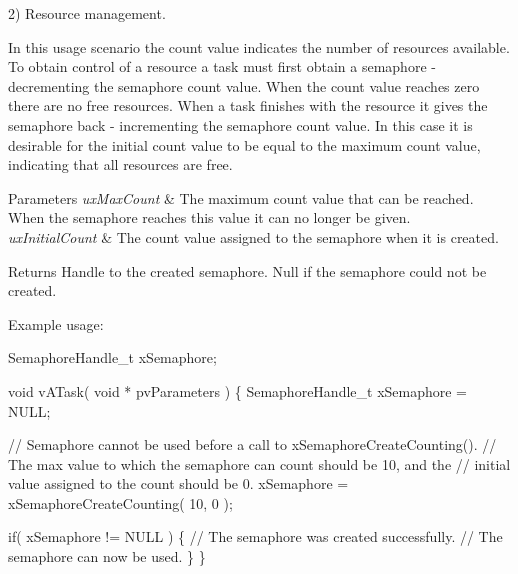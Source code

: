 2) Resource management.

In this usage scenario the count value indicates the number of resources available. To obtain control of a resource a task must first obtain a semaphore -\/ decrementing the semaphore count value. When the count value reaches zero there are no free resources. When a task finishes with the resource it \textquotesingle{}gives\textquotesingle{} the semaphore back -\/ incrementing the semaphore count value. In this case it is desirable for the initial count value to be equal to the maximum count value, indicating that all resources are free.


\begin{DoxyParams}{Parameters}
{\em ux\+Max\+Count} & The maximum count value that can be reached. When the semaphore reaches this value it can no longer be \textquotesingle{}given\textquotesingle{}.\\
\hline
{\em ux\+Initial\+Count} & The count value assigned to the semaphore when it is created.\\
\hline
\end{DoxyParams}
\begin{DoxyReturn}{Returns}
Handle to the created semaphore. Null if the semaphore could not be created.
\end{DoxyReturn}
Example usage\+: 
\begin{DoxyPre}
SemaphoreHandle\_t xSemaphore;\end{DoxyPre}



\begin{DoxyPre}void vATask( void * pvParameters )
\{
SemaphoreHandle\_t xSemaphore = NULL;\end{DoxyPre}



\begin{DoxyPre}   // Semaphore cannot be used before a call to xSemaphoreCreateCounting().
   // The max value to which the semaphore can count should be 10, and the
   // initial value assigned to the count should be 0.
   xSemaphore = xSemaphoreCreateCounting( 10, 0 );\end{DoxyPre}



\begin{DoxyPre}   if( xSemaphore != NULL )
   \{
       // The semaphore was created successfully.
       // The semaphore can now be used.
   \}
\}
\end{DoxyPre}
 